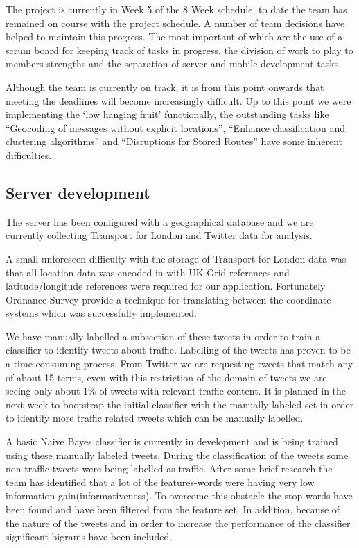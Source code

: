 The project is currently in Week 5 of the 8 Week schedule, to date the team has
remained on course with the project schedule. A number of team decisions have
helped to maintain this progress. The most important of which are the use of a
scrum board for keeping track of tasks in progress, the division of work to
play to members strengths and the separation of server and mobile development
tasks.

Although the team is currently on track, it is from this point onwards that
meeting the deadlines will become increasingly difficult. Up to this point we
were implementing the ‘low hanging fruit’ functionally, the outstanding tasks
like “Geocoding of messages without explicit locations”, “Enhance
classification and clustering algorithms” and “Disruptions for Stored Routes”
have some inherent difficulties.

\subsection{Server development}

The server has been configured with a geographical database and we are
currently collecting Transport for London and Twitter data for analysis.

A small unforeseen difficulty with the storage of Transport for London data was
that all location data was encoded in with UK Grid references and
latitude/longitude references were required for our application. Fortunately
Ordnance Survey provide a technique for translating between the coordinate
systems which was successfully implemented.

We have manually labelled a subsection of these tweets in order to train a
classifier to identify tweets about traffic. Labelling of the tweets has proven
to be a time consuming process. From Twitter we are requesting tweets that
match any of about 15 terms, even with this restriction of the domain of tweets
we are seeing only about 1\% of tweets with relevant traffic content. It is
planned in the next week to bootstrap the initial classifier with the manually
labeled set in order to identify more traffic related tweets which can be
manually labelled.

A basic Naive Bayes classifier is currently in development and is being trained
using these manually labeled tweets. During the classification  of the tweets
some non-traffic tweets were being labelled as traffic. After some brief
research the team has identified that a lot of the features-words were having
very low information gain(informativeness). To overcome this obstacle the
stop-words have been found and have been filtered from the feature set. In
addition, because of the nature of the tweets and in order to increase the
performance of the classifier significant bigrams have been included. 

